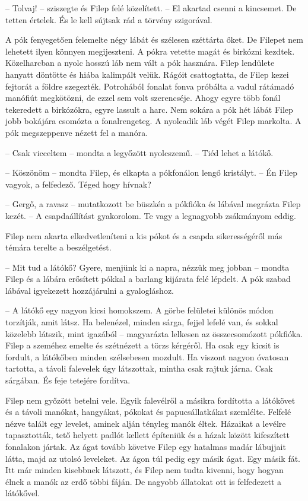 \documentclass[10pt]{memoir}
\begin{document}
-- Tolvaj! -- sziszegte és Filep felé közelített. -- El akartad csenni a
kincsemet. De tetten értelek. És le kell sújtsak rád a törvény szigorával.

A pók fenyegetően felemelte négy lábát és szélesen széttárta őket. De Filepet
nem lehetett ilyen könnyen megijeszteni. A pókra vetette magát és birkózni
kezdtek. Közelharcban a nyolc hosszú láb nem vált a pók hasznára. Filep
lendülete hanyatt döntötte és hiába kalimpált velük. Rágóit csattogtatta, de
Filep kezei fejtorát a földre szegezték. Potrohából fonalat fonva próbálta a
vadul rátámadó manófiút megkötözni, de ezzel sem volt szerencséje. Ahogy egyre
több fonál tekeredett a birkózókra, egyre lassult a harc. Nem sokára a pók hét
lábát Filep jobb bokájára csomózta a fonalrengeteg. A nyolcadik láb végét Filep
markolta. A pók megszeppenve nézett fel a manóra.

-- Csak vicceltem -- mondta a legyőzött nyolcszemű. -- Tiéd lehet a látókő.

-- Köszönöm -- mondta Filep, és elkapta a pókfonálon lengő kristályt. -- Én
Filep vagyok, a felfedező. Téged hogy hívnak?

-- Gergő, a ravasz -- mutatkozott be büszkén a pókfióka és lábával megrázta
Filep kezét. -- A csapdaállítást gyakorolom. Te vagy a legnagyobb zsákmányom
eddig.

Filep nem akarta elkedvetleníteni a kis pókot és a csapda sikerességéről más
témára terelte a beszélgetést.

-- Mit tud a látókő? Gyere, menjünk ki a napra, nézzük meg jobban -- mondta
Filep és a lábára erősített pókkal a barlang kijárata felé lépdelt. A pók
szabad lábával igyekezett hozzájárulni a gyalogláshoz.

-- A látókő egy nagyon kicsi homokszem. A görbe felületei különös módon
torzítják, amit látsz. Ha belenézel, minden sárga, fejjel lefelé van, és sokkal
közelebb látszik, mint igazából -- magyarázta lelkesen az összecsomózott
pókfióka. Filep a szeméhez emelte és szétnézett a törzs kérgéről. Ha csak egy
kicsit is fordult, a látókőben minden szélsebesen mozdult. Ha viszont nagyon
óvatosan tartotta, a távoli falevelek úgy látszottak, mintha csak rajtuk járna.
Csak sárgában. És feje tetejére fordítva.

Filep nem győzött betelni vele. Egyik falevélről a másikra fordította a
látókövet és a távoli manókat, hangyákat, pókokat és papucsállatkákat
szemlélte. Felfelé nézve talált egy levelet, aminek alján tényleg manók éltek.
Házaikat a levélre tapasztották, tető helyett padlót kellett építeniük és a
házak között kifeszített fonalakon jártak. Az ágat tovább követve Filep egy
hatalmas madár lábujjait látta, majd az utolsó leveleket. Az ágon túl pedig egy
másik ágat. Egy másik fát. Itt már minden kisebbnek látszott, és Filep nem
tudta kivenni, hogy hogyan élnek a manók az erdő többi fáján. De nagyobb
állatokat ott is felfedezett a látókővel.
\end{document}
